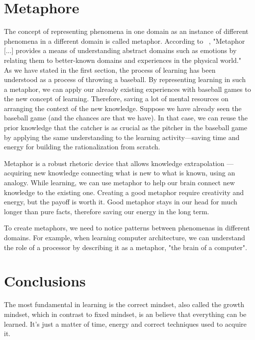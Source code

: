 \documentclass{article}
\begin{document}
\section{Metaphore}
The concept of representing phenomena in one domain as an instance of different phenomena in a different domain is called metaphor. 
According to ~\cite{radden2007cognitive},  "Metaphor [...] provides a means of understanding abstract domains such as emotions by relating them to better-known domains and experiences in the physical world."
As we have stated in the first section, the process of learning has been understood as a process of throwing a baseball. By representing learning in such a metaphor, we can apply our already existing experiences with baseball games to the new concept of learning. Therefore, saving a lot of mental resources on arranging the context of the new knowledge. Suppose we have already seen the baseball game (and the chances are that we have). In that case, we can reuse the prior knowledge that the catcher is as crucial as the pitcher in the baseball game by applying the same understanding to the learning activity—saving time and energy for building the rationalization from scratch.

Metaphor is a robust rhetoric device that allows knowledge extrapolation — acquiring new knowledge connecting what is new to what is known, using an analogy. While learning, we can use metaphor to help our brain connect new knowledge to the existing one. Creating a good metaphor require creativity and energy, but the payoff is worth it. Good metaphor stays in our head for much longer than pure facts, therefore saving our energy in the long term. 

To create metaphors, we need to notice patterns between phenomenas in different domains.  For example, when learning computer architecture, we can understand the role of a processor by describing it as a metaphor, "the brain of a computer".

\section{Conclusions}

The most fundamental in learning is the correct mindset, also called the growth mindset, which in contrast to fixed mindset, is an believe that everything can be learned. It's just a matter of time, energy and correct techniques used to acquire it. 



\end{document}
